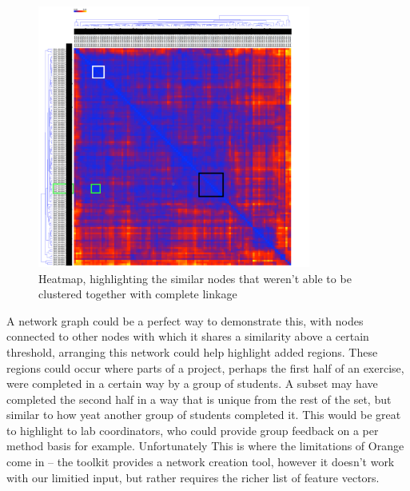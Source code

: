 \begin{figure}[h!]

	\centering
		\includegraphics[width=0.8\textwidth]{Figures/NonClusteredCluster}
	\caption{Heatmap, highlighting the similar nodes that weren't able
	to be clustered together with complete linkage}
	\label{fig:TopMarkComparison}

\end{figure}

A network graph could be a perfect way to demonstrate this, with nodes connected
to other nodes with which it shares a similarity above a certain threshold,
arranging this network could help highlight added regions. These regions could
occur where parts of a project, perhaps the first half of an exercise, were
completed in a certain way by a group of students. A subset may have completed
the second half in a way that is unique from the rest of the set, but similar
to how yeat another group of students completed it. This would be great to
highlight to lab coordinators, who could provide group feedback on a per method
basis for example. Unfortunately This is where the limitations of Orange come in
-- the toolkit provides a network creation tool, however it doesn't work with
our limitied input, but rather requires the richer list of feature vectors.

